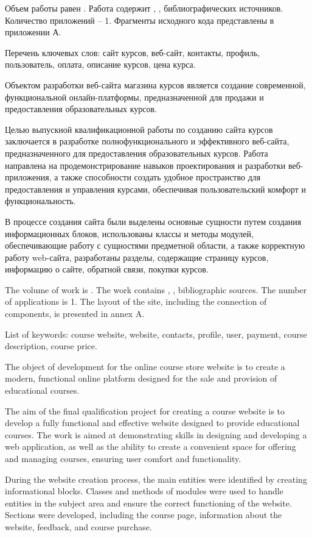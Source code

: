 
Объем работы равен . Работа содержит , ,  библиографических источников. Количество приложений – 1. Фрагменты исходного кода представлены в приложении А.

Перечень ключевых слов: сайт курсов, веб-сайт, контакты, профиль, пользователь, оплата, описание курсов, цена курса.

Объектом разработки веб-сайта магазина курсов является создание современной, функциональной онлайн-платформы, предназначенной для продажи и предоставления образовательных курсов.

Целью выпускной квалификационной работы по созданию сайта курсов заключается в разработке полнофункционального и эффективного веб-сайта, предназначенного для предоставления образовательных курсов. Работа направлена на продемонстрирование навыков проектирования и разработки веб-приложения, а также способности создать удобное пространство для предоставления и управления курсами, обеспечивая пользовательский комфорт и функциональность.

В процессе создания сайта были выделены основные сущности путем создания информационных блоков, использованы классы и методы модулей, обеспечивающие работу с сущностями предметной области, а также корректную работу web-сайта, разработаны разделы, содержащие страницу курсов, информацию о сайте, обратной связи, покупки курсов.


  
The volume of work is . The work contains , ,  bibliographic sources. The number of applications is 1. The layout of the site, including the connection of components, is presented in annex A.

List of keywords: course website, website, contacts, profile, user, payment, course description, course price.

The object of development for the online course store website is to create a modern, functional online platform designed for the sale and provision of educational courses.

The aim of the final qualification project for creating a course website is to develop a fully functional and effective website designed to provide educational courses. The work is aimed at demonstrating skills in designing and developing a web application, as well as the ability to create a convenient space for offering and managing courses, ensuring user comfort and functionality.

During the website creation process, the main entities were identified by creating informational blocks. Classes and methods of modules were used to handle entities in the subject area and ensure the correct functioning of the website. Sections were developed, including the course page, information about the website, feedback, and course purchase.
